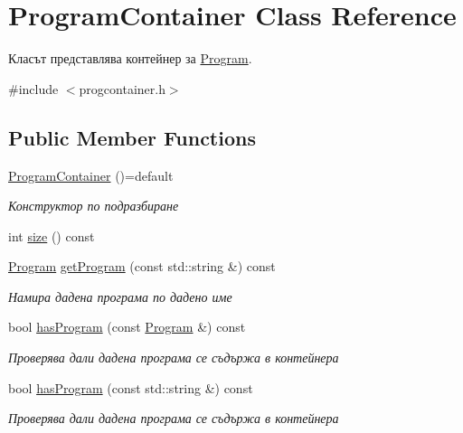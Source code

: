 \hypertarget{class_program_container}{}\section{Program\+Container Class Reference}
\label{class_program_container}


Класът представлява контейнер за \hyperlink{class_program}{Program}.  




{\ttfamily \#include $<$progcontainer.\+h$>$}

\subsection*{Public Member Functions}
\begin{DoxyCompactItemize}
\item 
\hyperlink{class_program_container_a1be740ee44808c1933d74eb7a44d1a17}{Program\+Container} ()=default
\begin{DoxyCompactList}\small\item\em Конструктор по подразбиране \end{DoxyCompactList}\item 
int \hyperlink{class_program_container_a6dc1ecf361eb185c1149d1ee6ad01645}{size} () const
\item 
\hyperlink{class_program}{Program} \hyperlink{class_program_container_ab43924ef5c4933e74e362d9bb0902ece}{get\+Program} (const std\+::string \&) const
\begin{DoxyCompactList}\small\item\em Намира дадена програма по дадено име \end{DoxyCompactList}\item 
bool \hyperlink{class_program_container_a2a4ab6a0e5eb941af91ac0644d569bab}{has\+Program} (const \hyperlink{class_program}{Program} \&) const
\begin{DoxyCompactList}\small\item\em Проверява дали дадена програма се съдържа в контейнера \end{DoxyCompactList}\item 
bool \hyperlink{class_program_container_a395e4e5881d1cabca7d429e386610014}{has\+Program} (const std\+::string \&) const
\begin{DoxyCompactList}\small\item\em Проверява дали дадена програма се съдържа в контейнера \end{DoxyCompactList}\item 

\end{DoxyCompactItemize}
